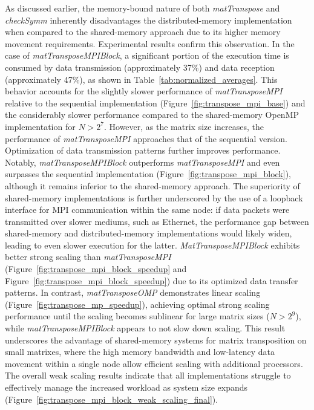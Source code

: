 \documentclass[conference]{IEEEtran}
\begin{document}
As discussed earlier, the memory-bound nature of both \textit{matTranspose}
and \textit{checkSymm} inherently disadvantages the distributed-memory
implementation when compared to the shared-memory approach due to its
higher memory movement requirements. Experimental results confirm this
observation. In the case of \textit{matTransposeMPIBlock}, a significant
portion of the execution time is consumed by data transmission
(approximately 37\%) and data reception (approximately 47\%), as shown
in Table~\ref{tab:normalized_averages}. This behavior accounts for the
slightly slower performance of \textit{matTransposeMPI} relative to the
sequential implementation (Figure~\ref{fig:transpose_mpi_base}) and the
considerably slower performance compared to the shared-memory OpenMP
implementation for $N > 2^7$. However, as the matrix size increases,
the performance of \textit{matTransposeMPI} approaches that of the
sequential version. Optimization of data transmission patterns further
improves performance. Notably, \textit{matTransposeMPIBlock} outperforms
\textit{matTransposeMPI} and even surpasses the sequential implementation
(Figure~\ref{fig:transpose_mpi_block}), although it remains inferior
to the shared-memory approach. The superiority of shared-memory
implementations is further underscored by the use of a loopback interface
for MPI communication within the same node: if data packets were
transmitted over slower mediums, such as Ethernet, the performance gap
between shared-memory and distributed-memory implementations would
likely widen, leading to even slower execution for the latter.
\textit{MatTransposeMPIBlock} exhibits better strong scaling than
\textit{matTransposeMPI} (Figure~\ref{fig:transpose_mpi_block_speedup}
and Figure~\ref{fig:transpose_mpi_block_speedup}) due to its optimized data
transfer patterns. In contrast, \textit{matTransposeOMP}
demonstrates linear scaling (Figure~\ref{fig:transpose_mp_speedup}), achieving
optimal strong scaling performance until the scaling becomes sublinear
for large matrix sizes ($N>2^{9}$), while \textit{matTransposeMPIBlock}
appears to not slow down scaling. This result underscores the
advantage of shared-memory systems for matrix transposition on small matrixes,
where the high memory bandwidth and low-latency data movement within
a single node allow efficient scaling with additional processors. The
overall weak scaling results indicate that all implementations
struggle to effectively manage the increased workload as system size
expands (Figure~\ref{fig:transpose_mpi_block_weak_scaling_final}).
\end{document}
